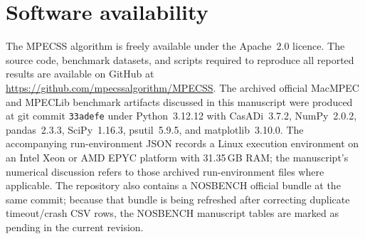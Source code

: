 \documentclass[]{interact}
\theoremstyle{plain}
\theoremstyle{definition}
\theoremstyle{remark}
\begin{document}
\section*{Software availability}

The MPECSS algorithm is freely available under the Apache~2.0 licence.
The source code, benchmark datasets, and scripts required to reproduce
all reported results are available on GitHub at
\url{https://github.com/mpecssalgorithm/MPECSS}.
The archived official MacMPEC and MPECLib benchmark artifacts discussed
in this manuscript were produced at git commit
\texttt{33adefe} under Python~3.12.12 with CasADi~3.7.2,
NumPy~2.0.2, pandas~2.3.3, SciPy~1.16.3, psutil~5.9.5, and
matplotlib~3.10.0. The accompanying run-environment JSON records a
Linux execution environment on an Intel Xeon or AMD EPYC platform with
31.35\,GB RAM; the manuscript's numerical discussion refers to those
archived run-environment files where applicable. The repository also
contains a NOSBENCH official bundle at the same commit; because that
bundle is being refreshed after correcting duplicate timeout/crash CSV
rows, the NOSBENCH manuscript tables are marked as pending in the
current revision.




\end{document}
